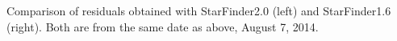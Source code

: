 Comparison of residuals obtained with StarFinder2.0 (left) and StarFinder1.6 (right). Both are from the same date as above, August 7, 2014.
  